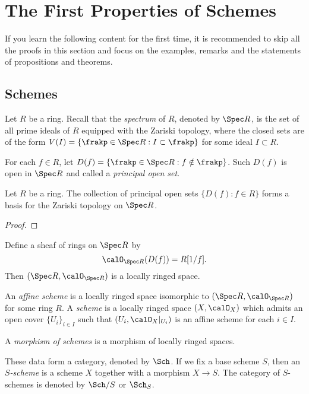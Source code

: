 \section{The First Properties of Schemes}

If you learn the following content for the first time, it is recommended to skip all the proofs in this section and focus on the examples, remarks and the statements of propositions and theorems.

\subsection{Schemes}

    Let \(R\) be a ring.
    Recall that the \emph{spectrum} of \(R\), denoted by \(\Spec R\), is the set of all prime ideals of \(R\) equipped with the Zariski topology, 
    where the closed sets are of the form \(V(I) = \{\frakp \in \Spec R : I \subset \frakp\}\) for some ideal \(I \subset R\).

    For each \(f \in R\), let \(D(f) = \{\frakp \in \Spec R : f \notin \frakp\}\).
    Such \(D(f)\) is open in \(\Spec R\) and called a \emph{principal open set}.
    
    \begin{proposition}\label{prop:principal_open_sets_form_a_basis}
        Let \(R\) be a ring.
        The collection of principal open sets \(\{D(f) : f \in R\}\) forms a basis for the Zariski topology on \(\Spec R\).
    \end{proposition}
    \begin{proof}
    \end{proof}

    Define a sheaf of rings on \(\Spec R\) by 
    \[ \calO_{\Spec R}(D(f)) = R[1/f]. \]
    Then \((\Spec R, \calO_{\Spec R})\) is a locally ringed space.

    \begin{definition}\label{def:affine_scheme_and_scheme}
        An \emph{affine scheme} is a locally ringed space isomorphic to \((\Spec R, \calO_{\Spec R})\) for some ring \(R\).
        A \emph{scheme} is a locally ringed space \((X, \calO_X)\) which admits an open cover \(\{U_i\}_{i \in I}\) such that \((U_i, \calO_X|_{U_i})\) is an affine scheme for each \(i \in I\).

        A \emph{morphism of schemes} is a morphism of locally ringed spaces.

        These data form a category, denoted by \(\Sch\).
        If we fix a base scheme \(S\), then an \emph{\(S\)-scheme} is a scheme \(X\) together with a morphism \(X \to S\).
        The category of \(S\)-schemes is denoted by \(\Sch/S\) or \(\Sch_S\).
    \end{definition}

